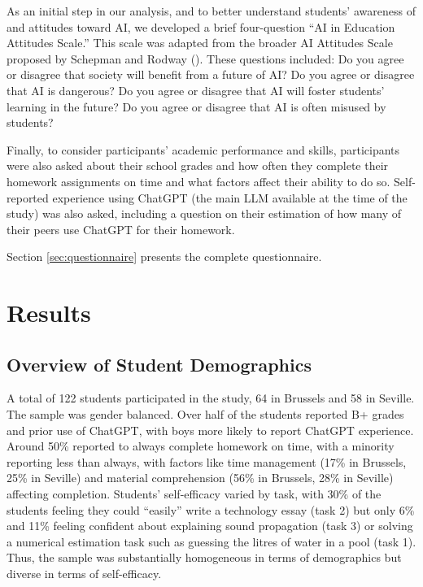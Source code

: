 \documentclass[
  11pt,
]{article}
\begin{document}
As an initial step in our analysis, and to better understand students' awareness of and attitudes toward AI, we developed a brief four-question ``AI in Education Attitudes Scale.'' This scale was adapted from the broader AI Attitudes Scale proposed by Schepman and Rodway (). These questions included: Do you agree or disagree that society will benefit from a future of AI? Do you agree or disagree that AI is dangerous? Do you agree or disagree that AI will foster students' learning in the future? Do you agree or disagree that AI is often misused by students?

Finally, to consider participants' academic performance and skills, participants were also asked about their school grades and how often they complete their homework assignments on time and what factors affect their ability to do so. Self-reported experience using ChatGPT (the main LLM available at the time of the study) was also asked, including a question on their estimation of how many of their peers use ChatGPT for their homework.

Section \ref{sec:questionnaire} presents the complete questionnaire.

\section{Results}\label{sec:results}

\subsection{Overview of Student Demographics}\label{overview-of-student-demographics}

A total of 122 students participated in the study, 64 in Brussels and 58 in Seville. The sample was gender balanced. Over half of the students reported B+ grades and prior use of ChatGPT, with boys more likely to report ChatGPT experience. Around 50\% reported to always complete homework on time, with a minority reporting less than always, with factors like time management (17\% in Brussels, 25\% in Seville) and material comprehension (56\% in Brussels, 28\% in Seville) affecting completion. Students' self-efficacy varied by task, with 30\% of the students feeling they could ``easily'' write a technology essay (task 2) but only 6\% and 11\% feeling confident about explaining sound propagation (task 3) or solving a numerical estimation task such as guessing the litres of water in a pool (task 1). Thus, the sample was substantially homogeneous in terms of demographics but diverse in terms of self-efficacy.
\end{document}
